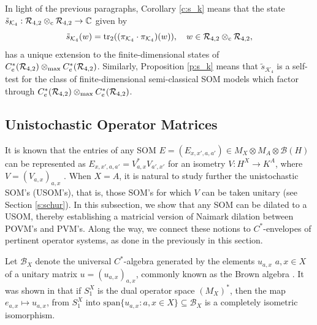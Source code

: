 \documentclass[11pt]{amsart}
\theoremstyle{definition}
\newcommand{\cl}[1]{\mathcal{#1}}
\newcommand{\ten}{\otimes}
\begin{document}
In light of the previous paragraphs, 
Corollary \ref{c:s_k} means that the state  $\tilde{s}_{\cl K_4}:\cl{R}_{4,2}\ten_{\rm c}\cl{R}_{4,2}\to \mathbb{C}$ given by 
$$\tilde{s}_{\cl K_4}(w)
= {\rm tr}_2((\pi_{\cl K_4}\cdot \pi_{\cl K_4})(w)), \ \ \ 
w\in \cl R_{4,2}\otimes_{\rm c} \cl R_{4,2},$$
has a unique extension to the finite-dimensional states of $C^*_e(\cl R_{4,2})\ten_{\rm max} C^*_e(\cl R_{4,2})$. Similarly, Proposition \ref{p:s_k} means that $\tilde{s}_{\cl K_4}$ is a self-test for the class of finite-dimensional semi-classical SOM models which factor through $C^*_e(\cl R_{4,2})\ten_{\rm max} C^*_e(\cl R_{4,2})$.




\subsection{Unistochastic Operator Matrices}\label{uni}

It is known that the entries of any SOM $E=(E_{x,x',a,a'})\in M_X\ten M_A\ten \cl{B}(H)$ can be represented as $E_{x,x',a,a'}=V_{a,x}^*V_{a',x'}$ for an isometry 
$V:H^X\to K^A$, where $V = (V_{a,x})_{a,x}$ \cite[Theorem 3.1]{tt-QNS}. When $X=A$, it is natural to study further 
the unistochastic SOM's (USOM's), that is, 
those SOM's for which $V$ can be taken unitary (see Section \ref{s:schur}). 
In this subsection, we show that any SOM can be dilated to a USOM, thereby establishing a matricial version of Naimark dilation between POVM's and PVM's. Along the way, we connect these notions to $C^*$-envelopes of pertinent operator systems, as done in the previously in this section. 


Let $\cl{B}_X$ denote the universal $C^*$-algebra generated by the elements $u_{a,x}$ $a,x\in X$ of a unitary matrix $u=(u_{a,x})_{a,x}$, commonly known as the Brown algebra \cite{brown}. It was shown in \cite[Proposition 2.3]{ghj} that if $S_1^X$ is the dual operator space $(M_X)^*$, 
then the map $e_{a,x}\mapsto u_{a,x}$, from 
$S^X_1$ into $\mathrm{span}\{u_{a,x}: a,x\in X\}\subseteq\cl{B}_X$
is a completely isometric isomorphism. 
\end{document}
